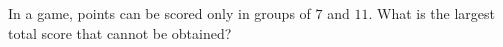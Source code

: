 In a game, points can be scored only in groups of $7$ and $11$. What is the largest total score that cannot be obtained?
